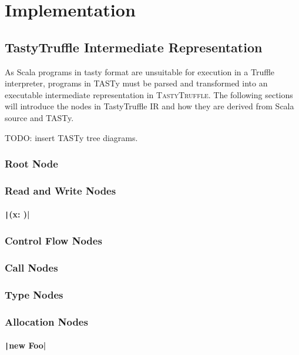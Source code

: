 \chapter{Implementation}

\section{TastyTruffle Intermediate Representation}

As Scala programs in \acrshort{tasty} format are unsuitable for execution in a Truffle interpreter, programs in TASTy must be parsed and transformed into an executable intermediate representation in \textsc{TastyTruffle}. The following sections will introduce the nodes in TastyTruffle IR and how they are derived from Scala source and TASTy.

TODO: insert TASTy tree diagrams.

\subsection{Root Node}

\subsection{Read and Write Nodes}

\subsubsection{\texttt|(x: )|}

\subsection{Control Flow Nodes}

\subsection{Call Nodes}

\subsection{Type Nodes}

\subsection{Allocation Nodes}

\subsubsection{\texttt|new Foo|}

